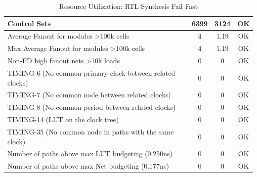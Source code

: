 \documentclass{article}
\begin{document}
\begin{table}[H]
\begin{tabular}{|l|c|c|c|}
    Control Sets                                                      & 6399               & 3124                 & OK              \\ \hline
    Average Fanout for modules \textgreater 100k cells               & 4                  & 1.19                 & OK              \\ \hline
    Max Average Fanout for modules \textgreater 100k cells           & 4                  & 1.19                 & OK              \\ \hline
    Non-FD high fanout nets \textgreater 10k loads                   & 0                  & 0                    & OK              \\ \hline
    TIMING-6 (No common primary clock between related clocks)         & 0                  & 0                    & OK              \\ \hline
    TIMING-7 (No common node between related clocks)                  & 0                  & 0                    & OK              \\ \hline
    TIMING-8 (No common period between related clocks)                & 0                  & 0                    & OK              \\ \hline
    TIMING-14 (LUT on the clock tree)                                 & 0                  & 0                    & OK              \\ \hline
    TIMING-35 (No common node in paths with the same clock)           & 0                  & 0                    & OK              \\ \hline
    Number of paths above max LUT budgeting (0.250ns)                 & 0                  & 0                    & OK              \\ \hline
    Number of paths above max Net budgeting (0.177ns)                 & 0                  & 0                    & OK              \\ \hline
    \end{tabular}
    \caption{Resource Utilization: RTL Synthesis Fail Fast}
\end{table}

    
\end{document}
